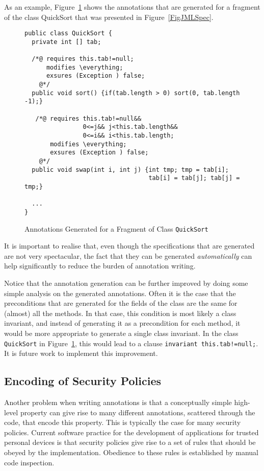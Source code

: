 As an example, Figure~\ref{FigAnnotSpec} shows the annotations that
are generated for a fragment of the class QuickSort that was presented in
Figure~\ref{FigJMLSpec}. 
\begin{figure}[t!]
{\small
\begin{verbatim}
public class QuickSort {
  private int [] tab;

  /*@ requires this.tab!=null;
      modifies \everything;
      exsures (Exception ) false;
    @*/
  public void sort() {if(tab.length > 0) sort(0, tab.length -1);}

   /*@ requires this.tab!=null&& 
                0<=j&& j<this.tab.length&&
                0<=i&& i<this.tab.length;
       modifies \everything;
       exsures (Exception ) false;
    @*/
  public void swap(int i, int j) {int tmp; tmp = tab[i]; 
                                  tab[i] = tab[j]; tab[j] = tmp;}

  ...
}
\end{verbatim}
}
\caption{Annotations Generated for a Fragment of Class
\texttt{QuickSort}}\label{FigAnnotSpec} 
\end{figure}
It is important to realise that, even though the specifications that
are generated are not very spectacular, the fact that they can be
generated \emph{automatically} can help significantly to reduce the
burden of annotation writing.

Notice that the annotation generation can be further improved by doing
some simple analysis on the generated annotations. Often it is the
case that the preconditions that are generated for the fields of the
class are the same for (almost) all the methods. In that case, this
condition is most likely a class invariant, and instead of generating
it as a precondition for each method, it would be more appropriate to
generate a single class invariant. In the class \texttt{QuickSort} in
Figure~\ref{FigAnnotSpec}, this would lead to a clause
\texttt{invariant this.tab!=null;}. It is future work to implement
this improvement.

\subsection{Encoding of Security Policies}

Another problem when writing annotations is that a conceptually simple
high-level property can give rise to many different annotations,
scattered through the code, that encode this property. This is
typically the case for many security policies. Current software
practice for the development of applications for trusted personal
devices is that security policies give rise to a set of rules that
should be obeyed by the implementation. Obedience to these rules is
established by manual code inspection.

